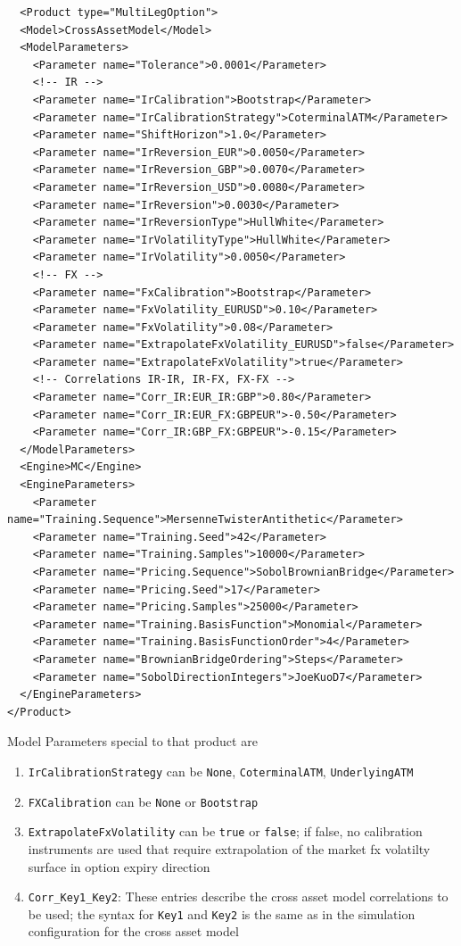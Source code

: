 \documentclass[12pt, a4paper]{article}
\begin{document}
\begin{verbatim}
  <Product type="MultiLegOption">
  <Model>CrossAssetModel</Model>
  <ModelParameters>
    <Parameter name="Tolerance">0.0001</Parameter>
    <!-- IR -->
    <Parameter name="IrCalibration">Bootstrap</Parameter>
    <Parameter name="IrCalibrationStrategy">CoterminalATM</Parameter>
    <Parameter name="ShiftHorizon">1.0</Parameter>
    <Parameter name="IrReversion_EUR">0.0050</Parameter>
    <Parameter name="IrReversion_GBP">0.0070</Parameter>
    <Parameter name="IrReversion_USD">0.0080</Parameter>
    <Parameter name="IrReversion">0.0030</Parameter>
    <Parameter name="IrReversionType">HullWhite</Parameter>
    <Parameter name="IrVolatilityType">HullWhite</Parameter>
    <Parameter name="IrVolatility">0.0050</Parameter>
    <!-- FX -->
    <Parameter name="FxCalibration">Bootstrap</Parameter>
    <Parameter name="FxVolatility_EURUSD">0.10</Parameter>
    <Parameter name="FxVolatility">0.08</Parameter>
    <Parameter name="ExtrapolateFxVolatility_EURUSD">false</Parameter>
    <Parameter name="ExtrapolateFxVolatility">true</Parameter>
    <!-- Correlations IR-IR, IR-FX, FX-FX -->
    <Parameter name="Corr_IR:EUR_IR:GBP">0.80</Parameter>
    <Parameter name="Corr_IR:EUR_FX:GBPEUR">-0.50</Parameter>
    <Parameter name="Corr_IR:GBP_FX:GBPEUR">-0.15</Parameter>
  </ModelParameters>
  <Engine>MC</Engine>
  <EngineParameters>
    <Parameter name="Training.Sequence">MersenneTwisterAntithetic</Parameter>
    <Parameter name="Training.Seed">42</Parameter>
    <Parameter name="Training.Samples">10000</Parameter>
    <Parameter name="Pricing.Sequence">SobolBrownianBridge</Parameter>
    <Parameter name="Pricing.Seed">17</Parameter>
    <Parameter name="Pricing.Samples">25000</Parameter>
    <Parameter name="Training.BasisFunction">Monomial</Parameter>
    <Parameter name="Training.BasisFunctionOrder">4</Parameter>
    <Parameter name="BrownianBridgeOrdering">Steps</Parameter>
    <Parameter name="SobolDirectionIntegers">JoeKuoD7</Parameter>
  </EngineParameters>
</Product>
\end{verbatim}

Model Parameters special to that product are

\begin{enumerate}
\item \verb+IrCalibrationStrategy+ can be \verb+None+, \verb+CoterminalATM+, \verb+UnderlyingATM+
\item \verb+FXCalibration+ can be \verb+None+ or \verb+Bootstrap+
\item \verb+ExtrapolateFxVolatility+ can be \verb+true+ or \verb+false+; if false, no calibration instruments are used
  that require extrapolation of the market fx volatilty surface in option expiry direction
\item \verb+Corr_Key1_Key2+: These entries describe the cross asset model correlations to be used; the syntax for
  \verb+Key1+ and \verb+Key2+ is the same as in the simulation configuration for the cross asset model
\end{enumerate}
\end{document}
